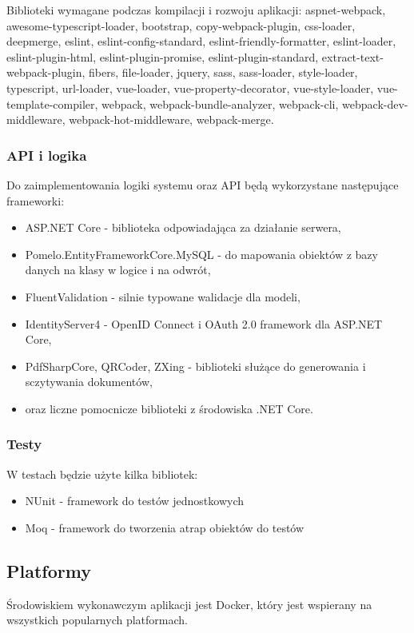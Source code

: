 \documentclass{article}
\begin{document}
Biblioteki wymagane podczas kompilacji i rozwoju aplikacji: aspnet-webpack, awesome-typescript-loader, bootstrap, copy-webpack-plugin, css-loader, deepmerge, eslint, eslint-config-standard, eslint-friendly-formatter, eslint-loader, eslint-plugin-html, eslint-plugin-promise, eslint-plugin-standard, extract-text-webpack-plugin, fibers, file-loader, jquery, sass, sass-loader, style-loader, typescript, url-loader, vue-loader, vue-property-decorator, vue-style-loader, vue-template-compiler, webpack, webpack-bundle-analyzer, webpack-cli, webpack-dev-middleware, webpack-hot-middleware, webpack-merge.

\subsubsection{API i logika}
Do zaimplementowania logiki systemu oraz API będą wykorzystane następujące frameworki:
\begin{itemize}
    \item ASP.NET Core - biblioteka odpowiadająca za działanie serwera,
    \item Pomelo.EntityFrameworkCore.MySQL - do mapowania obiektów z bazy danych na klasy w logice i na odwrót,
    \item FluentValidation - silnie typowane walidacje dla modeli,
    \item IdentityServer4 - OpenID Connect i OAuth 2.0 framework dla ASP.NET Core,
    \item PdfSharpCore, QRCoder, ZXing - biblioteki służące do generowania i sczytywania dokumentów,
    \item oraz liczne pomocnicze biblioteki z środowiska .NET Core.
\end{itemize}

\subsubsection{Testy}
W testach będzie użyte kilka bibliotek: 
\begin{itemize}
    \item NUnit - framework do testów jednostkowych
    \item Moq - framework do tworzenia atrap obiektów do testów
\end{itemize}

\subsection{Platformy}
Środowiskiem wykonawczym aplikacji jest Docker, który jest wspierany na wszystkich popularnych platformach.
\end{document}
